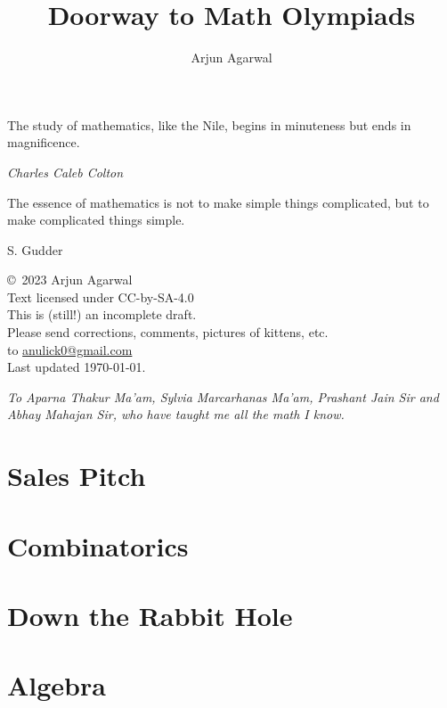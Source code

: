 \documentclass{maaprb}
\title{Doorway to Math Olympiads}
\author{Arjun Agarwal}
\begin{document}
\frontmatter
\maketitle
\epigraph{The study of mathematics, like the Nile, begins in minuteness but ends in magnificence.}{\textit{Charles Caleb Colton}}
\epigraph{The essence of mathematics is not to make simple things complicated, but to make complicated things simple.}{S. Gudder}
\pagebreak

\begin{center}
\copyright\ 2023 Arjun Agarwal \\
Text licensed under CC-by-SA-4.0 \\
This is (still!) an incomplete draft. \\
Please send corrections, comments, pictures of kittens, etc. \\
to \href{mailto:anulick0@gmail.com}{anulick0@gmail.com} \\
Last updated \today.
\end{center}
\pagebreak

\thispagestyle{empty}
\vspace*{13.5pc}
\begin{center}
{\em To Aparna Thakur Ma'am, Sylvia Marcarhanas Ma'am, Prashant Jain Sir and Abhay Mahajan Sir, who have taught me all the math I know.} 
\end{center}
\pagebreak


\tableofcontents





\mainmatter
\part{Sales Pitch}

\part{Combinatorics}






\part{Down the Rabbit Hole}





\part{Algebra}



\end{document}
